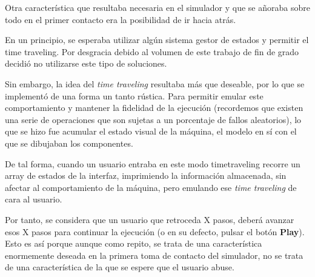 Otra característica que resultaba necesaria en el simulador y que se añoraba sobre todo en el primer
contacto era la posibilidad de ir hacia atrás.

\bigskip
En un principio, se esperaba utilizar algún sistema gestor de estados y permitir el time traveling. 
Por desgracia debido al volumen de este trabajo de fin de grado decidió no utilizarse este tipo de 
soluciones.

\bigskip
Sin embargo, la idea del \textit{time traveling} resultaba más que deseable, por lo que se implementó
de una forma un tanto rústica. Para permitir emular este comportamiento y mantener la fidelidad de 
la ejecución (recordemos que existen una serie de operaciones que son sujetas a un porcentaje de fallos
aleatorios), lo que se hizo fue acumular el estado visual de la máquina, el modelo en sí con el 
que se dibujaban los componentes.

\bigskip
De tal forma, cuando un usuario entraba en este modo timetraveling recorre un array de estados de la 
interfaz, imprimiendo la información almacenada, sin afectar al comportamiento de la máquina, pero 
emulando ese \textit{time traveling} de cara al usuario.

\bigskip
Por tanto, se considera que un usuario que retroceda X pasos, deberá avanzar esos X pasos para continuar
la ejecución (o en su defecto, pulsar el botón \textbf{Play}). Esto es así porque aunque como repito, se 
trata de una característica enormemente deseada en la primera toma de contacto del simulador, no se trata
de una característica de la que se espere que el usuario abuse.